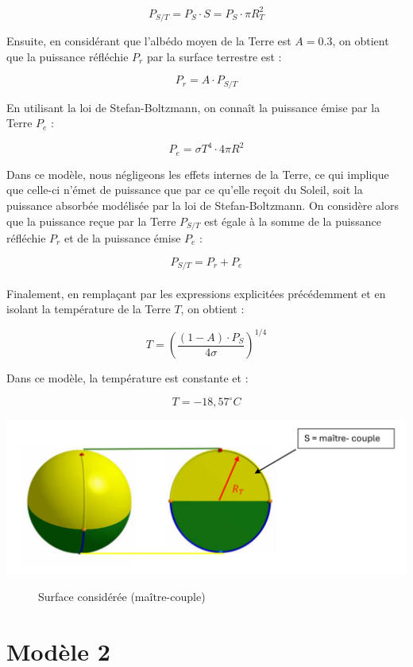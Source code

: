 \documentclass[a4paper,11pt]{article}
\begin{document}
\[ P_{S/T} = P_S \cdot S = P_S \cdot \pi R_T^2  \]

Ensuite, en considérant que l'albédo moyen de la Terre est $A = 0.3$, on obtient que la puissance réfléchie $P_r$ par la surface terrestre est :

\[ P_r = A \cdot P_{S/T} \]

En utilisant la loi de Stefan-Boltzmann, on connaît la puissance émise par la Terre $P_e$ :

\[ P_e = \sigma T^4 \cdot 4 \pi R^2 \]

Dans ce modèle, nous négligeons les effets internes de la Terre, ce qui implique que celle-ci n'émet de puissance que par ce qu'elle reçoit du Soleil, soit la puissance absorbée modélisée par la loi de Stefan-Boltzmann. On considère alors que la puissance reçue par la Terre $P_{S/T}$ est égale à la somme de la puissance réfléchie $P_r$ et de la puissance émise $P_e$ :

\[ P_{S/T} = P_r + P_e \] \\

Finalement, en remplaçant par les expressions explicitées précédemment et en isolant la température de la Terre $T$, on obtient :

\[ T = \left(\dfrac{(1 - A) \cdot P_S}{4\sigma}\right)^{1/4} \]

Dans ce modèle, la température est constante et  :

\[ T = -18,57 ^{\circ} C \]

\begin{adjustbox}{center}
\includegraphics[scale=0.9]{Schema_maitre_couple}
\end{adjustbox}
\begin{figure}[h]
  \centering
  \caption{Surface considérée (maître-couple)}
\end{figure}

\section{Modèle 2}
\end{document}
